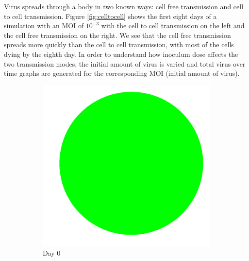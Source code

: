 \documentclass[a4paper]{article}
\begin{document}
Virus spreads through a body in two known ways: cell free transmission and cell to cell transmission. Figure \ref{fig:celltocell} shows the first eight days of a simulation with an MOI of $10^{-3}$ with the cell to cell transmission on the left and the cell free transmission on the right. We see that the cell free transmission spreads more quickly than the cell to cell transmission, with most of the cells dying by the eighth day. In order to understand how inoculum dose affects the two transmission modes, the initial amount of virus is varied and total virus over time graphs are generated for the corresponding MOI (initial amount of virus).

\clearpage
\begin{center}
\begin{minipage}{0.65\linewidth}
\begin{figure}[H]
    \centering
    \begin{subfigure}[b]{0.4\linewidth}
        \includegraphics[width=\linewidth]{cell_to_cell_photos/celltocell0.png}
        \caption{Day 0}
    \end{subfigure}
    \begin{subfigure}[b]{0.4\linewidth}

\end{subfigure}
\end{figure}
\end{minipage}
\end{center}
\end{document}
